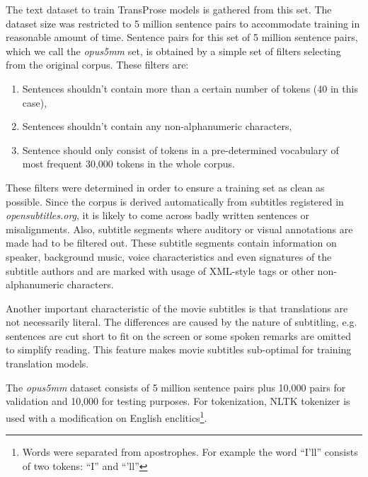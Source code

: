 The text dataset to train TransProse models is gathered from this set. The dataset size was restricted to 5 million sentence pairs to accommodate training in reasonable amount of time. Sentence pairs for this set of 5 million sentence pairs, which we call the \textit{opus5mm} set, is obtained by a simple set of filters selecting from the original corpus. These filters are: 

\begin{enumerate}
    \item Sentences shouldn't contain more than a certain number of tokens (40 in this case),
    \item Sentences shouldn't contain any non-alphanumeric characters,
    \item Sentence should only consist of tokens in a pre-determined vocabulary of most frequent 30,000 tokens in the whole corpus.
\end{enumerate}

These filters were determined in order to ensure a training set as clean as possible. Since the corpus is derived automatically from subtitles registered in \textit{opensubtitles.org}, it is likely to come across badly written sentences or misalignments. Also, subtitle segments where auditory or visual annotations are made had to be filtered out. These subtitle segments contain information on speaker, background music, voice characteristics and even signatures of the subtitle authors and are marked with usage of XML-style tags or other non-alphanumeric characters. 

Another important characteristic of the movie subtitles is that translations are not necessarily literal. The differences are caused by the nature of subtitling, e.g. sentences are cut short to fit on the screen or some spoken remarks are omitted to simplify reading. This feature makes movie subtitles sub-optimal for training translation models. 

The \textit{opus5mm} dataset consists of 5 million sentence pairs plus 10,000 pairs for validation and 10,000 for testing purposes. For tokenization, NLTK tokenizer is used with a modification on English enclitics\footnote{Words were separated from apostrophes. For example the word ``I'll'' consists of two tokens: ``I'' and ``'ll''}. 

